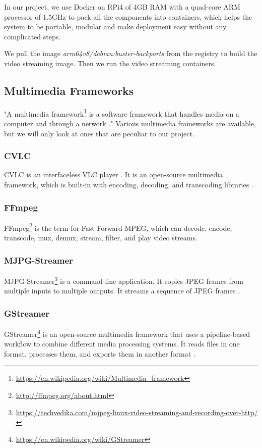 In our project, we use Docker on RPi4 of 4GB RAM with a quad-core ARM processor of 1.5GHz to pack all the components into containers, which helps the system to be portable, modular and make deployment easy without any complicated steps. \par

We pull the image \textit{arm64v8/debian:buster-backports} from the registry to build the video streaming image. Then we run the video streaming containers.

\subsection{Multimedia Frameworks}
"A multimedia framework\footnote{\url{https://en.wikipedia.org/wiki/Multimedia_framework}} is a software framework that handles media on a computer and through a network \cite{mf}." Various multimedia frameworks are available, but we will only look at ones that are peculiar to our project.

\subsubsection{CVLC}
CVLC is an interfaceless VLC player \cite{cvlc}. It is an open-source multimedia framework, which is built-in with encoding, decoding, and transcoding libraries \cite{cvlc1}.

\subsubsection{FFmpeg}
FFmpeg\footnote{\url{http://ffmpeg.org/about.html}} is the term for Fast Forward MPEG, which can decode, encode, transcode, mux, demux, stream, filter, and play video streams.

\subsubsection{MJPG-Streamer}
MJPG-Streamer\footnote{\url{https://techvedika.com/mjpeg-linux-video-streaming-and-recording-over-http/}} is a command-line application. It copies JPEG frames from multiple inputs to multiple outputs. It streams a sequence of JPEG frames \cite{mjpgstreamer}. 

\subsubsection{GStreamer}
GStreamer\footnote{\url{https://en.wikipedia.org/wiki/GStreamer}} is an open-source multimedia framework that uses a pipeline-based workflow to combine different media processing systems. It reads files in one format, processes them, and exports them in another format \cite{gstreamer}. 

